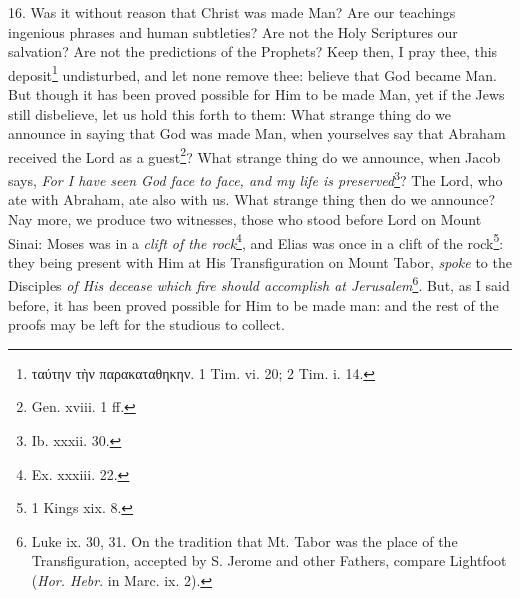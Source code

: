 16. Was it without reason that Christ was made Man? Are our teachings ingenious phrases and human subtleties? Are not the Holy Scriptures our salvation? Are not the predictions of the Prophets? Keep then, I pray thee, this deposit\footnote{\textgreek{ταύτην τὴν παρακαταθηκην}. 1 Tim. vi. 20; 2 Tim. i. 14.} undisturbed, and let none remove thee: believe that God became Man. But though it has been proved possible for Him to be made Man, yet if the Jews still disbelieve, let us hold this forth to them: What strange thing do we announce in saying that God was made Man, when yourselves say that Abraham received the Lord as a guest\footnote{Gen. xviii. 1 ff.}? What strange thing do we announce, when Jacob says, \emph{For I have seen God face to face, and my life is preserved}\footnote{Ib. xxxii. 30.}? The Lord, who ate with Abraham, ate also with us. What strange thing then do we announce? Nay more, we produce two witnesses, those who stood before Lord on Mount Sinai: Moses was in a \emph{clift of the rock}\footnote{Ex. xxxiii. 22.}, and Elias was once in a clift of the rock\footnote{1 Kings xix. 8.}: they being present with Him at His Transfiguration on Mount Tabor, \emph{spoke} to the Disciples \emph{of His decease which fire should accomplish at Jerusalem}\footnote{Luke ix. 30, 31. On the tradition that Mt. Tabor was the place of the Transfiguration, accepted by S. Jerome and other Fathers, compare Lightfoot (\emph{Hor. Hebr}. in Marc. ix. 2).}. But, as I said before, it has been proved possible for Him to be made man: and the rest of the proofs may be left for the studious to collect.

